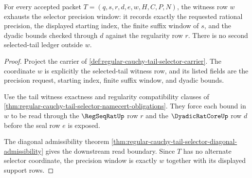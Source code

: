 \begin{theorem}
\label{thm:regular-cauchy-tail-selector-precision-window-exactness}
For every accepted packet $T=(q,s,r,d,e,w,H,C,P,N)$, the witness row $w$ exhausts the selector precision window: it records exactly the requested rational precision, the displayed starting index, the finite suffix window of $s$, and the dyadic bounds checked through $d$ against the regularity row $r$. There is no second selected-tail ledger outside $w$.
\end{theorem}
\begin{proof}
Project the carrier of \autoref{def:regular-cauchy-tail-selector-carrier}. The coordinate $w$ is explicitly the selected-tail witness row, and its listed fields are the precision request, starting index, finite suffix window, and dyadic bounds.

Use the tail witness exactness and regularity compatibility clauses of \autoref{thm:regular-cauchy-tail-selector-namecert-obligations}. They force each bound in $w$ to be read through the $\RegSeqRatUp$ row $r$ and the $\DyadicRatCoreUp$ row $d$ before the seal row $e$ is exposed.

The diagonal admissibility theorem \autoref{thm:regular-cauchy-tail-selector-diagonal-admissibility} gives the downstream read boundary. Since $T$ has no alternate selector coordinate, the precision window is exactly $w$ together with its displayed support rows.
\end{proof}

